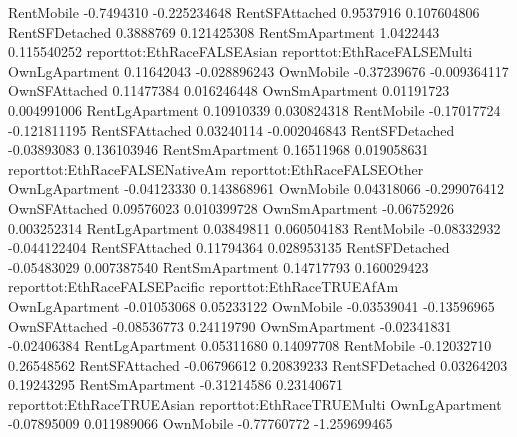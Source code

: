 \documentclass{article}
\begin{document}
\begin{Schunk}
\begin{Soutput}
RentMobile      -0.7494310               -0.225234648
RentSFAttached   0.9537916                0.107604806
RentSFDetached   0.3888769                0.121425308
RentSmApartment  1.0422443                0.115540252
                reporttot:EthRaceFALSEAsian reporttot:EthRaceFALSEMulti
OwnLgApartment                   0.11642043                -0.028896243
OwnMobile                       -0.37239676                -0.009364117
OwnSFAttached                    0.11477384                 0.016246448
OwnSmApartment                   0.01191723                 0.004991006
RentLgApartment                  0.10910339                 0.030824318
RentMobile                      -0.17017724                -0.121811195
RentSFAttached                   0.03240114                -0.002046843
RentSFDetached                  -0.03893083                 0.136103946
RentSmApartment                  0.16511968                 0.019058631
                reporttot:EthRaceFALSENativeAm reporttot:EthRaceFALSEOther
OwnLgApartment                     -0.04123330                 0.143868961
OwnMobile                           0.04318066                -0.299076412
OwnSFAttached                       0.09576023                 0.010399728
OwnSmApartment                     -0.06752926                 0.003252314
RentLgApartment                     0.03849811                 0.060504183
RentMobile                         -0.08332932                -0.044122404
RentSFAttached                      0.11794364                 0.028953135
RentSFDetached                     -0.05483029                 0.007387540
RentSmApartment                     0.14717793                 0.160029423
                reporttot:EthRaceFALSEPacific reporttot:EthRaceTRUEAfAm
OwnLgApartment                    -0.01053068                0.05233122
OwnMobile                         -0.03539041               -0.13596965
OwnSFAttached                     -0.08536773                0.24119790
OwnSmApartment                    -0.02341831               -0.02406384
RentLgApartment                    0.05311680                0.14097708
RentMobile                        -0.12032710                0.26548562
RentSFAttached                    -0.06796612                0.20839233
RentSFDetached                     0.03264203                0.19243295
RentSmApartment                   -0.31214586                0.23140671
                reporttot:EthRaceTRUEAsian reporttot:EthRaceTRUEMulti
OwnLgApartment                 -0.07895009                0.011989066
OwnMobile                      -0.77760772               -1.259699465

\end{Soutput}
\end{Schunk}
\end{document}
